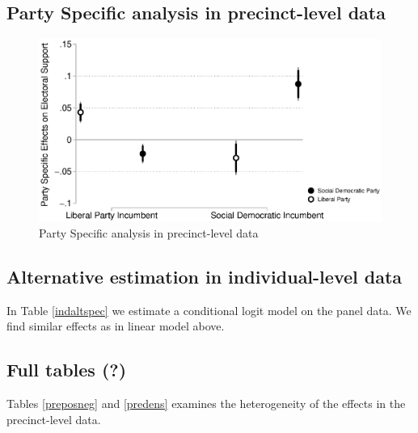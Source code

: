 \documentclass[12pt,a4paper]{article}
\begin{document}
	
	
	
	\newpage
	
	\subsection{Party Specific analysis in precinct-level data}
		
	\begin{figure}
		\includegraphics[width=1\textwidth]{../figures/partyspecific.eps}
		\caption{Party Specific analysis in precinct-level data}
	\end{figure}
	
	
	\subsection{Alternative estimation in individual-level data}
	In Table \ref{indaltspec} we estimate a conditional logit model on the panel data. We find similar effects as in linear model above.
	
	
	
	\newpage
	
	\subsection{Full tables (?)}
	\setcounter{table}{0}
	
	Tables \ref{preposneg} and \ref{predens} examines the heterogeneity of the effects in the precinct-level data.
	
	
	
	
	
\end{document}
